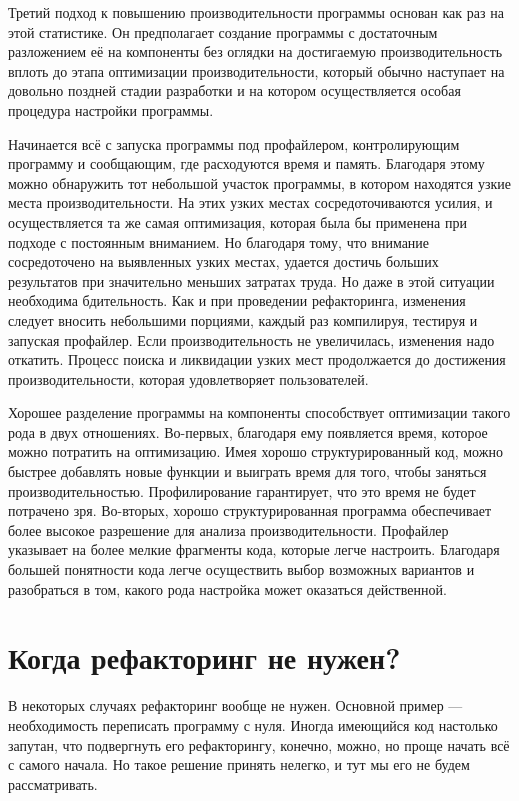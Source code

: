 \documentclass{../../text-style}
\begin{document}
Третий подход к повышению производительности программы основан как раз на этой статистике. Он предполагает создание программы с достаточным разложением её на компоненты без оглядки на достигаемую производительность вплоть до этапа оптимизации производительности, который обычно наступает на довольно поздней стадии разработки и на котором осуществляется особая процедура настройки программы.

Начинается всё с запуска программы под профайлером, контролирующим программу и сообщающим, где расходуются время и память. Благодаря этому можно обнаружить тот небольшой участок программы, в котором находятся узкие места производительности. На этих узких местах сосредоточиваются усилия, и осуществляется та же самая оптимизация, которая была бы применена при подходе с постоянным вниманием. Но благодаря тому, что внимание сосредоточено на выявленных узких местах, удается достичь больших результатов при значительно меньших затратах труда. Но даже в этой ситуации необходима бдительность. Как и при проведении рефакторинга, изменения следует вносить небольшими порциями, каждый раз компилируя, тестируя и запуская профайлер. Если производительность не увеличилась, изменения надо откатить. Процесс поиска и ликвидации узких мест продолжается до достижения производительности, которая удовлетворяет пользователей.

Хорошее разделение программы на компоненты способствует оптимизации такого рода в двух отношениях. Во-первых, благодаря ему появляется время, которое можно потратить на оптимизацию. Имея хорошо структурированный код, можно быстрее добавлять новые функции и выиграть время для того, чтобы заняться производительностью. Профилирование гарантирует, что это время не будет потрачено зря. Во-вторых, хорошо структурированная программа обеспечивает более высокое разрешение для анализа производительности. Профайлер указывает на более мелкие фрагменты кода, которые легче настроить. Благодаря большей понятности кода легче осуществить выбор возможных вариантов и разобраться в том, какого рода настройка может оказаться действенной.

\section{Когда рефакторинг не нужен?}

В некоторых случаях рефакторинг вообще не нужен. Основной пример --- необходимость переписать программу с нуля. Иногда имеющийся код настолько запутан, что подвергнуть его рефакторингу, конечно, можно, но проще начать всё с самого начала. Но такое решение принять нелегко, и тут мы его не будем рассматривать.
\end{document}
